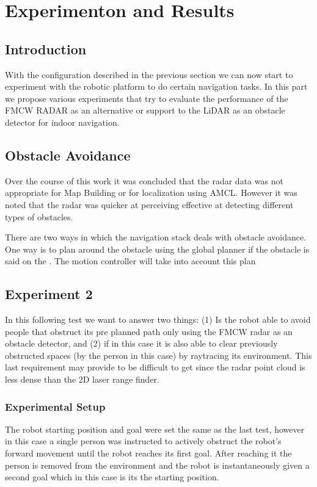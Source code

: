 \chapter{Experimenton and Results}

\section{Introduction}
With the configuration described in the previous section we can now start to experiment with the robotic platform to do certain navigation tasks. In this part we propose various experiments that try to evaluate the  performance of the \ac{FMCW} \ac{RADAR} as an alternative or support to the \ac{LiDAR} as an obstacle detector for indoor navigation.
\section{Obstacle Avoidance}
Over the course of this work it was concluded that the radar data was not appropriate for Map Building or for localization using \ac{AMCL}. However it was noted that the radar was quicker at perceiving effective at detecting different types of obstacles. 


There are two ways in which the navigation stack deals with obstacle avoidance. One way is to plan around the obstacle using the global planner if the obstacle is said on the .
The motion controller will take into account this plan 


\section {Experiment 2}
In this following test we want to answer two things: (1) Is the robot able to avoid people that obstruct its pre planned path only using the  \ac{FMCW} radar as an obstacle detector, and (2) if in this case it is also able to clear previously obstructed spaces (by the person in this case) by raytracing its environment. This last requirement may provide to be difficult to get since the radar point cloud is less dense than the 2D laser range finder.
\subsection{Experimental Setup}
The robot starting position and goal were set the same as the last test, however in this case a single person was instructed to actively obstruct the robot's forward movement until the robot reaches its first goal. After reaching it the person is removed from the environment  and the robot is  instantaneously given a second goal which in this case is its the starting position. 

